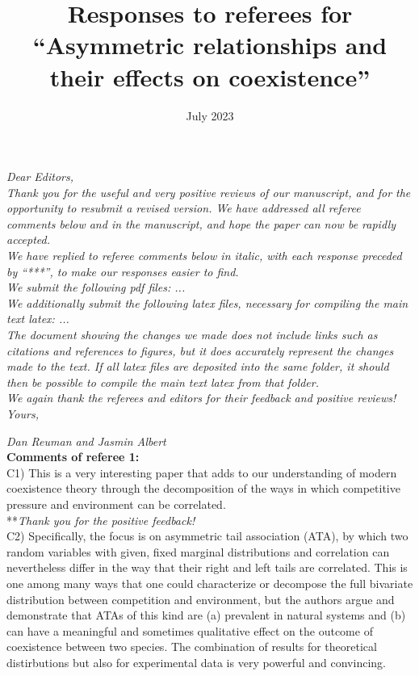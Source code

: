 \documentclass[letterpaper,11pt]{article}
\title{Responses to referees for ``Asymmetric relationships and their effects on coexistence''}
\date{July 2023}
\begin{document}
\noindent \emph{Dear Editors,} \\

\noindent \emph{Thank you for the useful and very positive reviews of our manuscript, and for
the opportunity to resubmit a revised version. We have addressed all referee comments below and in
the manuscript, and hope the paper can now be rapidly accepted. } \\

\noindent \emph{We have replied to referee comments below in italic, with each response preceded
by ``***'', to make our responses easier to find.} \\

\noindent \emph{We submit the following pdf files: ...} \\

\noindent \emph{We additionally submit the following latex files, necessary for compiling the
main text latex: ...} \\

\noindent \emph{The document showing the changes we made does not include links such as citations and
references to figures, but it does accurately represent the changes made to the text. 
If all latex files are deposited into the same folder, it should then be possible to 
compile the main text latex from that folder.} \\

\noindent \emph{We again thank the referees and editors for their feedback and positive reviews!} \\

\noindent \emph{Yours,}

\noindent \emph{Dan Reuman and Jasmin Albert} \\

\noindent \textbf{Comments of referee 1:} \\

\noindent C1) This is a very interesting paper that adds to our understanding of modern coexistence theory through the decomposition of the ways in which competitive pressure and environment can be correlated.\\

\noindent ***\emph{Thank you for the positive feedback!} \\

\noindent C2) Specifically, the focus is on asymmetric tail association (ATA), by which two random variables with given, fixed marginal distributions and correlation can nevertheless differ in the way that their right and left tails are correlated. This is one among many ways that one could characterize or decompose the full bivariate distribution between competition and environment, but the authors argue and demonstrate that ATAs of this kind are (a) prevalent in natural systems and (b) can have a meaningful and sometimes qualitative effect on the outcome of coexistence between two species.  The combination of results for theoretical distirbutions but also for experimental data is very powerful and convincing. \\
\end{document}
